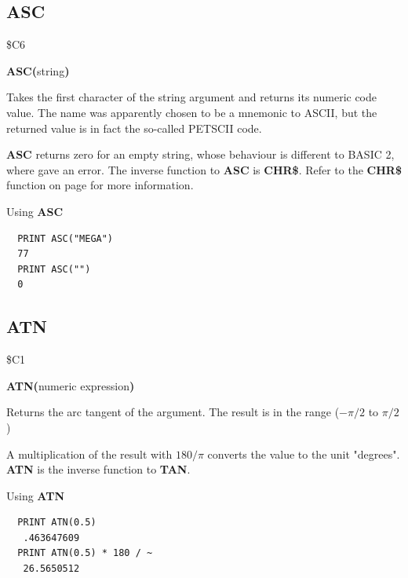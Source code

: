 \subsection{ASC}
\begin{description}[leftmargin=2cm,style=nextline]
\item [Token:] \$C6
\item [Format:] {\bf ASC(}string{\bf)}
\item [Usage:] Takes the first character of
               the string argument and returns its numeric code value.
               The name was apparently chosen to be a mnemonic to ASCII,
               but the returned value is in fact the so-called PETSCII code.
\item [Remarks:]
               {\bf ASC} returns zero for an empty string, whose behaviour
               is different to BASIC 2, where  gave an error.
               The inverse function to {\bf ASC} is {\bf CHR\$}.
               Refer to the {\bf CHR\$} function on page \pageref{chrcommand}
               for more information.

\item [Examples:] Using {\bf ASC}
\begin{tcolorbox}[colback=black,coltext=white]
\verbatimfont{\codefont}
\begin{verbatim}
  PRINT ASC("MEGA")
  77
  PRINT ASC("")
  0
\end{verbatim}
\end{tcolorbox}
\end{description}


\newpage
\subsection{ATN}
\begin{description}[leftmargin=2cm,style=nextline]
\item [Token:] \$C1
\item [Format:] {\bf ATN(}numeric expression{\bf)}
\item [Usage:] Returns the arc tangent of the argument.
               The result is in the range ($-\pi/2$ to $\pi/2$)

\item [Remarks:]
               A multiplication of the result with $180/\pi$
               converts the value to the unit "degrees".
               {\bf ATN} is the inverse function to {\bf TAN}.
\item [Examples:] Using {\bf ATN}
\begin{tcolorbox}[colback=black,coltext=white]
\verbatimfont{\codefont}
\begin{verbatim}
  PRINT ATN(0.5)
   .463647609
  PRINT ATN(0.5) * 180 / ~
   26.5650512
\end{verbatim}
\end{tcolorbox}
\end{description}

